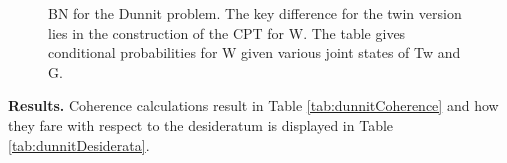 \documentclass[
  10pt,
]{scrartcl}
\begin{document}
\begin{figure}[H]
\hspace{-1cm}
\caption{BN for the \textsf{Dunnit} problem. The key difference for the twin version lies in the construction of the CPT for \textsf{W}. The table gives conditional probabilities for \textsf{W} given various joint states of \textsf{Tw} and \textsf{G}.}
\label{fig:twin}
\end{figure}

\textbf{Results.}
Coherence calculations result in Table \ref{tab:dunnitCoherence} and how they fare with respect to the desideratum is displayed in Table \ref{tab:dunnitDesiderata}.
\end{document}

